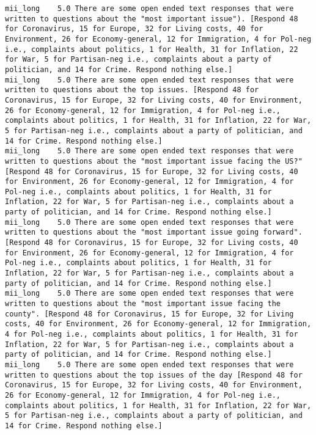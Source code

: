 \begin{lstlisting}[label=lst:promptvariants]
mii_long	5.0	There are some open ended text responses that were written to questions about the "most important issue"). [Respond 48 for Coronavirus, 15 for Europe, 32 for Living costs, 40 for Environment, 26 for Economy-general, 12 for Immigration, 4 for Pol-neg i.e., complaints about politics, 1 for Health, 31 for Inflation, 22 for War, 5 for Partisan-neg i.e., complaints about a party of politician, and 14 for Crime. Respond nothing else.]
mii_long	5.0	There are some open ended text responses that were written to questions about the top issues. [Respond 48 for Coronavirus, 15 for Europe, 32 for Living costs, 40 for Environment, 26 for Economy-general, 12 for Immigration, 4 for Pol-neg i.e., complaints about politics, 1 for Health, 31 for Inflation, 22 for War, 5 for Partisan-neg i.e., complaints about a party of politician, and 14 for Crime. Respond nothing else.]
mii_long	5.0	There are some open ended text responses that were written to questions about the "most important issue facing the US?" [Respond 48 for Coronavirus, 15 for Europe, 32 for Living costs, 40 for Environment, 26 for Economy-general, 12 for Immigration, 4 for Pol-neg i.e., complaints about politics, 1 for Health, 31 for Inflation, 22 for War, 5 for Partisan-neg i.e., complaints about a party of politician, and 14 for Crime. Respond nothing else.]
mii_long	5.0	There are some open ended text responses that were written to questions about the "most important issue going forward". [Respond 48 for Coronavirus, 15 for Europe, 32 for Living costs, 40 for Environment, 26 for Economy-general, 12 for Immigration, 4 for Pol-neg i.e., complaints about politics, 1 for Health, 31 for Inflation, 22 for War, 5 for Partisan-neg i.e., complaints about a party of politician, and 14 for Crime. Respond nothing else.]
mii_long	5.0	There are some open ended text responses that were written to questions about the "most important issue facing the county". [Respond 48 for Coronavirus, 15 for Europe, 32 for Living costs, 40 for Environment, 26 for Economy-general, 12 for Immigration, 4 for Pol-neg i.e., complaints about politics, 1 for Health, 31 for Inflation, 22 for War, 5 for Partisan-neg i.e., complaints about a party of politician, and 14 for Crime. Respond nothing else.]
mii_long	5.0	There are some open ended text responses that were written to questions about the top issues of the day [Respond 48 for Coronavirus, 15 for Europe, 32 for Living costs, 40 for Environment, 26 for Economy-general, 12 for Immigration, 4 for Pol-neg i.e., complaints about politics, 1 for Health, 31 for Inflation, 22 for War, 5 for Partisan-neg i.e., complaints about a party of politician, and 14 for Crime. Respond nothing else.]

\end{lstlisting}
